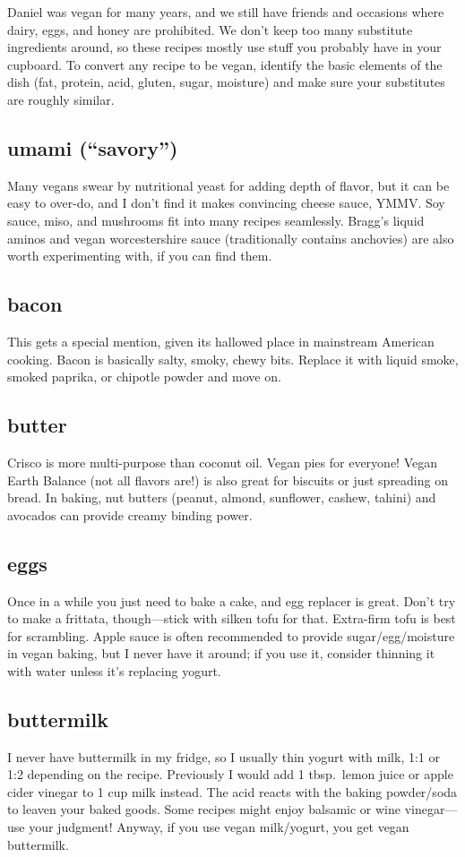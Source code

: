 Daniel was vegan for many years, and we still have friends and occasions where dairy, eggs, and honey are prohibited. We don't keep too many substitute ingredients around, so these recipes mostly use stuff you probably have in your cupboard. To convert any recipe to be vegan, identify the basic elements of the dish (fat, protein, acid, gluten, sugar, moisture) and make sure your substitutes are roughly similar.

\subsection{umami (``savory'')}
Many vegans swear by nutritional yeast for adding depth of flavor, but it can be easy to over-do, and I don't find it makes convincing cheese sauce, YMMV. Soy sauce, miso, and mushrooms fit into many recipes seamlessly. Bragg's liquid aminos and vegan worcestershire sauce (traditionally contains anchovies) are also worth experimenting with, if you can find them.

\subsection{bacon}
This gets a special mention, given its hallowed place in mainstream American cooking. Bacon is basically salty, smoky, chewy bits. Replace it with liquid smoke, smoked paprika, or chipotle powder and move on.

\subsection{butter}
Crisco is more multi-purpose than coconut oil. Vegan pies for everyone! Vegan Earth Balance (not all flavors are!) is also great for biscuits or just spreading on bread. In baking, nut butters (peanut, almond, sunflower, cashew, tahini) and avocados can provide creamy binding power.

\subsection{eggs}
Once in a while you just need to bake a cake, and egg replacer is great. Don't try to make a frittata, though---stick with silken tofu for that. Extra-firm tofu is best for scrambling. Apple sauce is often recommended to provide sugar/egg/moisture in vegan baking, but I never have it around; if you use it, consider thinning it with water unless it's replacing yogurt.

\subsection{buttermilk}
I never have buttermilk in my fridge, so I usually thin yogurt with milk, 1:1 or 1:2 depending on the recipe. Previously I would add 1 tbsp.\ lemon juice or apple cider vinegar to 1 cup milk instead. The acid reacts with the baking powder/soda to leaven your baked goods. Some recipes might enjoy balsamic or wine vinegar---use your judgment! Anyway, if you use vegan milk/yogurt, you get vegan buttermilk.


